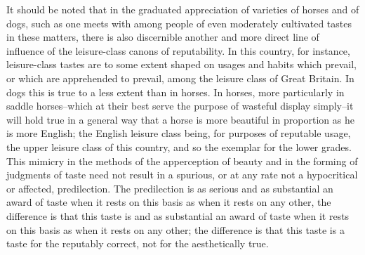 \documentclass[12pt]{report}
\begin{document}
It should be noted that in the graduated appreciation of varieties
of horses and of dogs, such as one meets with among people of even
moderately cultivated tastes in these matters, there is also discernible
another and more direct line of influence of the leisure-class canons of
reputability. In this country, for instance, leisure-class tastes are
to some extent shaped on usages and habits which prevail, or which are
apprehended to prevail, among the leisure class of Great Britain. In
dogs this is true to a less extent than in horses. In horses, more
particularly in saddle horses--which at their best serve the purpose of
wasteful display simply--it will hold true in a general way that a
horse is more beautiful in proportion as he is more English; the English
leisure class being, for purposes of reputable usage, the upper leisure
class of this country, and so the exemplar for the lower grades. This
mimicry in the methods of the apperception of beauty and in the forming
of judgments of taste need not result in a spurious, or at any rate not
a hypocritical or affected, predilection. The predilection is as serious
and as substantial an award of taste when it rests on this basis as
when it rests on any other, the difference is that this taste is and
as substantial an award of taste when it rests on this basis as when it
rests on any other; the difference is that this taste is a taste for the
reputably correct, not for the aesthetically true.
\end{document}
